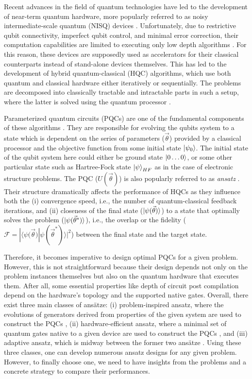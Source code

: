 \documentclass[%
 reprint,
 amsmath,
 amssymb,
 showkeys,
 pra,
 floatfix,
]{revtex4-2}
\begin{document}
Recent advances in the field of quantum technologies have led to the development of near-term quantum hardware, more popularly referred to as noisy intermediate-scale quantum (NISQ) devices \cite{nisq_preskill, RevModPhys.94.015004}. Unfortunately, due to restrictive qubit connectivity, imperfect qubit control, and minimal error correction, their computation capabilities are limited to executing only low depth algorithms \cite{9251243}. For this reason, these devices are supposedly used as accelerators for their classical counterparts instead of stand-alone devices themselves. This has led to the development of hybrid quantum-classical (HQC) algorithms, which use both quantum and classical hardware either iteratively or sequentially. The problems are decomposed into classically tractable and intractable parts in such a setup, where the latter is solved using the quantum processor \cite{Endo2021-zy}. 

Parameterized quantum circuits (PQCs) are one of the fundamental components of these algorithms \cite{Benedetti2019-gz}. They are responsible for evolving the qubits system to a state which is dependent on the series of parameters ($\vec{\theta}$) provided by a classical processor and the objective function from some initial state $\ket{\psi_0}$. The initial state of the qubit system here could either be ground state $\ket{0\ldots0}$, or some other particular state such as Hartree-Fock state $\ket{\psi}_{HF}$ as in the case of electronic structure problems. The PQC ($U(\vec{\theta})$) is also popularly referred to as \textit{ansatz} \cite{Benedetti2019-gz}. Their structure dramatically affects the performance of HQCs as they influence both the (i) convergence speed, i.e., the number of quantum-classical feedback iterations, and (ii) closeness of the final state ($\ket{\psi({\vec{\theta}})}$) to a state that optimally solves the problem ($\ket{\psi({\vec{\theta}^*})}$), i.e., the overlap or the fidelity ($\mathcal{F} = |\langle\psi({\vec{\theta})} | \psi({\vec{\theta}^*})\rangle|^{2}$) \cite{9781107002173} between the final state and the target state. 

Therefore, it becomes imperative to design optimal PQCs for a given problem. However, this is not straightforward because their design depends not only on the problem instances themselves but also on the quantum hardware that executes them. After all, some essential properties like depth of circuit post compilation depend on the hardware's topology and the supported native gates. Overall, there exist three main classes of ansätze: (i) problem-inspired ansatz, where the evolutions of generators derived from properties of the given system are used to construct the PQCs \cite{Romero2018-uc}, (ii) hardware-efficient ansatz, where a minimal set of quantum gates native to a given device are used to construct the PQCs \cite{Kandala2017-wn}, and (iii) adaptive ansatz, which is midway between the former two ansätze \cite{PRXQuantum.2.020310}. Using these three classes, one can develop numerous ansatz designs for any given problem. However, to finally choose one, we need to have insights from the problems and a concrete strategy to compare their performances.
\end{document}

